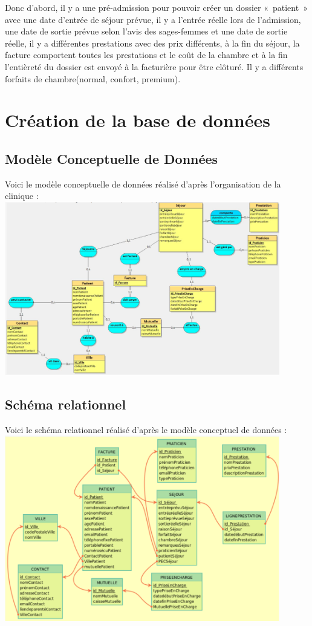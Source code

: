 \documentclass[12pt]{article}
\begin{document}
{\begin{adjustwidth}{20pt}{20pt}
    Donc d’abord, il y a une pré-admission pour pouvoir créer un dossier « patient » avec une date d’entrée de séjour prévue, il y a l’entrée réelle lors de l’admission, une date de sortie prévue selon l’avis des sages-femmes et une date de sortie réelle, il y a différentes prestations avec des prix différents, à la fin du séjour, la facture comportent toutes les prestations et le coût de la chambre et à la fin l’entièreté du dossier est envoyé à la facturière pour être clôturé. Il y a différents forfaits de chambre(normal, confort, premium).
    \newpage
    \section{Création de la base de données}
    \subsection{Modèle Conceptuelle de Données}
    Voici le modèle conceptuelle de données réalisé d'après l'organisation de la clinique :\bigskip\linebreak
    \includegraphics[width=0.9\textwidth]{MCD.png}\\[4cm]
    \newpage
    \subsection{Schéma relationnel}
    Voici le schéma relationnel réalisé d'après le modèle conceptuel de données :\bigskip\linebreak
    \includegraphics[width=0.9\textwidth]{SR.png}\\[4cm]
    \newpage

\end{adjustwidth}}
\end{document}
